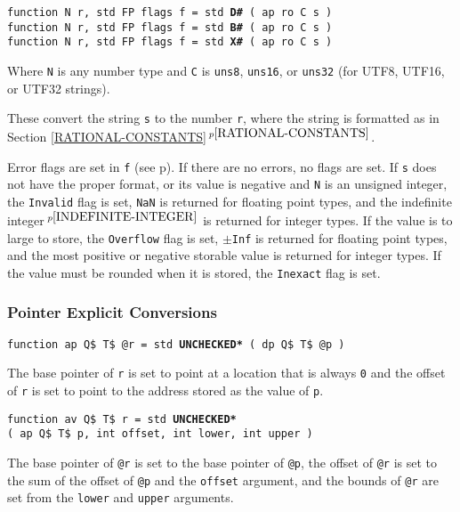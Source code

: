 \documentclass[12pt]{article}
\newcommand{\ttkey}[1]{{\tt \bfseries #1}}
\newcommand{\itemref}[1]{\ref{#1}$\,^{p\pageref{#1}}$}
\newcommand{\pagref}[1]{p\pageref{#1}}
\newcommand{\pagnote}[1]{$\,^{p\pageref{#1}}$}
\newenvironment{indpar}[1][0.3in]%
	{\begin{list}{}%
		     {\setlength{\itemsep}{0in}%
		      \setlength{\topsep}{0in}%
		      \setlength{\parsep}{1ex}%
		      \setlength{\labelwidth}{#1}%
		      \setlength{\leftmargin}{#1}%
		      \addtolength{\leftmargin}{\labelsep}}%
	 \item}%
	{\end{list}}
\begin{document}
{\tt function N r, std FP flags f = std \ttkey{D\#} ( ap ro C s )} \\
{\tt function N r, std FP flags f = std \ttkey{B\#} ( ap ro C s )} \\
{\tt function N r, std FP flags f = std \ttkey{X\#} ( ap ro C s )}
\label{RUN-TIME-STRING-TO-NUMBER-CONVERSIONS}
\begin{indpar}
Where {\tt N} is any number type
and {\tt C} is {\tt uns8}, {\tt uns16}, or {\tt uns32} (for UTF8, UTF16,
or UTF32 strings).

These convert the string {\tt s} to the number {\tt r}, where the
string is formatted as in Section \itemref{RATIONAL-CONSTANTS}.

Error flags are set in {\tt f} (see \pagref{FP-FLAGS}).
If there are no errors, no flags are set.
If {\tt s} does not have the proper format,
or its value is negative and {\tt N} is an unsigned integer,
the {\tt Invalid} flag is set, {\tt NaN} is returned for floating point types,
and the indefinite integer\pagnote{INDEFINITE-INTEGER}
is returned for integer types.
If the value is to large to store, the
{\tt Overflow} flag is set,
{\tt $\pm$Inf} is returned for floating point types,
and the most positive or negative storable value is returned
for integer types.  If the value must be rounded when it is stored,
the {\tt Inexact} flag is set.
\end{indpar}

\subsubsection{Pointer Explicit Conversions}

{\tt function ap Q\$ T\$ @r = std \ttkey{*UNCHECKED*} ( dp Q\$ T\$ @p )}
\begin{indpar}
The base pointer of {\tt r} is set to point at a location that is
always {\tt 0} and the offset of {\tt r} is set to point to the
address stored as the value of {\tt p}.
\end{indpar}

{\tt function av Q\$ T\$ r = std \ttkey{*UNCHECKED*} \\
\hspace*{0.2in}( ap Q\$ T\$ p, int offset, int lower, int upper )}
\begin{indpar}
The base pointer of {\tt @r} is set to the base pointer of {\tt @p},
the offset of {\tt @r} is set to the sum of the offset of {\tt @p}
and the {\tt offset} argument, and the bounds of {\tt @r} are set from
the {\tt lower} and {\tt upper} arguments.
\end{indpar}
\end{document}
